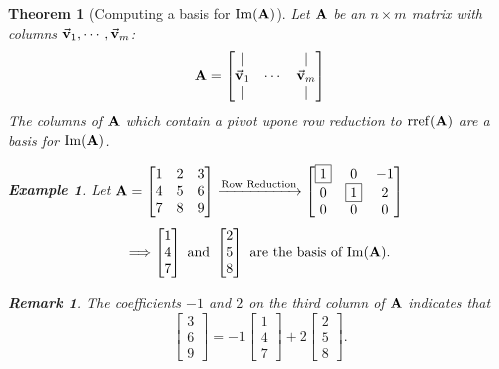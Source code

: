 \documentclass[12pt, a4paper]{article}
\newtheorem{thm}{Theorem}[subsection]
\newtheorem{eg}{Example}[subsection]
\newtheorem*{rmk}{\indent Remark}
\def\IM{{\mathrm{Im}}}
\def\rref{\mathrm{rref}}
\def\vecv{\va{v}}
\def\matrixA{\vb{A}}
\begin{document}
\begin{thm}[Computing a basis for $\IM(\matrixA)$]
	Let $\matrixA$ be an $n\times m$ matrix with columns $\vecv_1,\cdots,\vecv_m$: \[\matrixA=\begin{bmatrix}|&&|\\\vecv_1&\cdots&\vecv_m\\|&&|\end{bmatrix}\] The columns of $\matrixA	$ which contain a pivot upone row reduction to $\rref(\matrixA)$ are a basis for $\IM(\matrixA)$.
	\begin{eg}
		Let $\matrixA=\begin{bmatrix}1&2&3\\4&5&6\\7&8&9\end{bmatrix}\xrightarrow[]{\text{Row Reduction}}\begin{bmatrix}\boxed{1}&0&-1\\0&\boxed{1}&2\\0&0&0\end{bmatrix}$	
		\[\Longrightarrow\begin{bmatrix}1\\4\\7\end{bmatrix}\text{ and }\begin{bmatrix}2\\5\\8\end{bmatrix}\text{ are the basis of }\IM(\matrixA).\]
		\begin{rmk}
			The coefficients $-1$ and $2$ on the third column of $\matrixA$ indicates that \[\begin{bmatrix}3\\6\\9\end{bmatrix}=-1\begin{bmatrix}1\\4\\7\end{bmatrix}+2\begin{bmatrix}2\\5\\8\end{bmatrix}.\]
		\end{rmk}
	\end{eg}
	

\end{thm}
\end{document}
